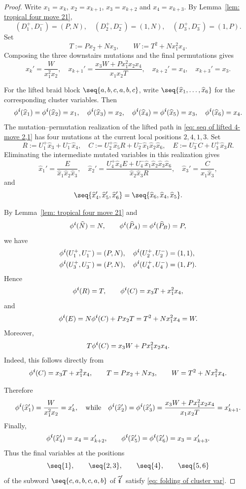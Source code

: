 \documentclass[12pt, leqno]{amsart}
\numberwithin{equation}{section}
\theoremstyle{plain}
\theoremstyle{definition}
\newcommand{\seteq}{\mathbin{:=}}
\newcommand{\ii}{ \textbf{\textit{i}}}
\newcommand{\hN}{\widehat{N}}
\newcommand{\hP}{\widehat{P}}
\newcommand{\hx}{\widehat{x}}
\newcommand{\hii}{{\widehat{\ii}}}
\begin{document}
\begin{proof}
Write $x_1=x_k$, $x_2=x_{k+1}$, $x_3=x_{k+2}$ and $x_4=x_{k+3}$.
By Lemma~\ref{lem: tropical four move 21},
\[
(D_1^+,D_1^-)=(P,N),\quad (D_2^+,D_2^-)=(1,N),\quad (D_3^+,D_3^-)=(1,P).
\]
Set
\[
T \seteq Px_2+Nx_3,\qquad W \seteq T^2+Nx_1^2x_4.
\]
Composing the three downstairs mutations and the final permutations
gives
\[
x_k'=\frac{W}{x_1^2x_2},\quad x_{k+1}'=\frac{x_3W+Px_1^2x_2x_4}{x_1x_2T},\quad x_{k+2}'=x_4,\quad x_{k+3}'=x_3.
\]

  For the lifted braid block $\seq{a,b,c,a,b,c}$, write 
$\seq{\hx_1,\ldots,\hx_6}$ for the corresponding cluster variables.
Then
\[
\phi^\ii(\hx_1)=\phi^\ii(\hx_2)=x_1,\quad
\phi^\ii(\hx_3)=x_2,\quad
\phi^\ii(\hx_4)=\phi^\ii(\hx_5)=x_3,\quad
\phi^\ii(\hx_6)=x_4.
\]
 The mutation--permutation realization of the lifted path in
\eqref{eq: seq of lifted 4-move 2,1} has four mutations at the current local positions $2,4,1,3$. Set
\[
R \seteq U_1^+\hx_3+U_1^-\hx_4,\quad
C \seteq U_2^+\hx_5R+U_2^-\hx_1\hx_2\hx_6,\quad
E \seteq U_3^-C+U_3^+\hx_3R.
\]
Eliminating the intermediate mutated variables  in this realization gives
\[
\hx_1'=\frac{E}{\hx_1\hx_2\hx_3},\quad
\hx_2'=\frac{U_4^+\hx_4E+U_4^-\hx_1\hx_2\hx_3\hx_6}
{\hx_2\hx_3R},\quad
\hx_3'=\frac{C}{\hx_1\hx_3},
\]
and
\[
\seq{\hx_4',\hx_5',\hx_6'}=\seq{\hx_6,\hx_4,\hx_5}.
\]

By Lemma~\ref{lem: tropical four move 21} and
\[
\phi^\ii(\hN)=N,\qquad \phi^\ii(\hP_A)=\phi^\ii(\hP_B)=P,
\]
we have
\begin{align*}
\phi^\ii(U_1^+,U_1^-)&=(P,N),\quad \phi^\ii(U_2^+,U_2^-)=(1,1),\allowdisplaybreaks \\
\phi^\ii(U_3^+,U_3^-)&=(P,N),\quad \phi^\ii(U_4^+,U_4^-)=(1,P).
\end{align*}
Hence
\[
\phi^\ii(R)=T,\qquad \phi^\ii(C)=x_3T+x_1^2x_4,
\]
and
\[
\phi^\ii(E) =N\phi^\ii(C)+Px_2T =T^2+Nx_1^2x_4 =W.
\]
Moreover,
\[
T\phi^\ii(C)=x_3W+Px_1^2x_2x_4.
\]
Indeed, this follows directly from
\[
\phi^\ii(C)=x_3T+x_1^2x_4,\qquad T=Px_2+Nx_3,\qquad W=T^2+Nx_1^2x_4.
\]

Therefore
\[
\phi^\ii(\hx_1') =\frac{W}{x_1^2x_2} =x_k',
\quad \text{while}\quad
\phi^\ii(\hx_2') =\phi^\ii(\hx_3') =\frac{x_3W+Px_1^2x_2x_4}{x_1x_2T} =x_{k+1}'.
\]
Finally,
\[
\phi^\ii(\hx_4')=x_4=x_{k+2}',\qquad
\phi^\ii(\hx_5')=\phi^\ii(\hx_6')=x_3=x_{k+3}'.
\]
Thus  the final variables at the positions
\[
\seq{1},\qquad \seq{2,3},\qquad \seq{4},\qquad \seq{5,6}
\]
  of the subword $\seq{c,a,b,c,a,b}$ of $\hii'$ satisfy 
\eqref{eq: folding of cluster var}.
\end{proof}
\end{document}
